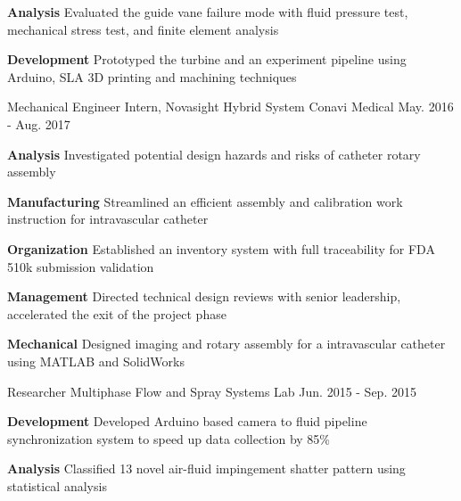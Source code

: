 \begin{cventries}
{\begin{cvitems}
			\item {\textbf{Analysis} Evaluated the guide vane failure mode with fluid pressure test, mechanical stress test, and finite element analysis}
			\item {\textbf{Development} Prototyped the turbine and an experiment pipeline using Arduino, SLA 3D printing and machining techniques}
		\end{cvitems}
	}
	\cventry
	{Mechanical Engineer Intern, Novasight Hybrid System}
	{Conavi Medical} 
	{May. 2016 - Aug. 2017}
	{}
	{
		\begin{cvitems}
			\item {
				\textbf{Analysis} Investigated potential design hazards and risks of catheter rotary assembly
			}
			\item {
				\textbf{Manufacturing} Streamlined an efficient assembly and calibration work instruction for intravascular catheter}
			\item {
				\textbf{Organization} Established an inventory system with full traceability for FDA 510k submission validation}
			\item {
				\textbf{Management} Directed technical design reviews with senior leadership, accelerated the exit of the project phase}
			\item {
				\textbf{Mechanical} Designed imaging and rotary assembly for a intravascular catheter using MATLAB and SolidWorks
			}
		\end{cvitems}
	}
	\cventry
	{Researcher}
	{Multiphase Flow and Spray Systems Lab} 
	{Jun. 2015 - Sep. 2015}
	{}
	{
		\begin{cvitems}
			\item {
				\textbf{Development} Developed Arduino based camera to fluid pipeline synchronization system to speed up data collection by 85\%
			}
			\item {
				\textbf{Analysis} Classified 13 novel air-fluid impingement shatter pattern using statistical analysis}
		\end{cvitems}
	}  
\end{cventries}
